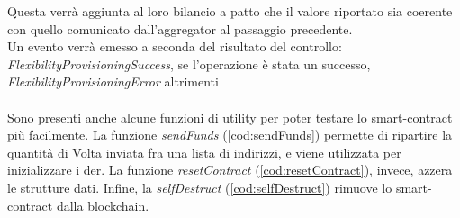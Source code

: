 Questa verrà aggiunta al loro bilancio a patto che il valore riportato sia coerente con quello comunicato dall'\gls{aggregator} al passaggio precedente. \\
Un evento verrà emesso a seconda del risultato del controllo: \textit{FlexibilityProvisioningSuccess}, se l'operazione è stata un successo, \textit{FlexibilityProvisioningError} altrimenti \\
\\
Sono presenti anche alcune funzioni di utility per poter testare lo \gls{smart-contract} più facilmente.
La funzione \textit{sendFunds} (\autoref{cod:sendFunds}) permette di ripartire la quantità di Volta inviata fra una lista di indirizzi,
e viene utilizzata per inizializzare i \gls{der}.
La funzione \textit{resetContract} (\autoref{cod:resetContract}), invece, azzera le strutture dati.
Infine, la \textit{selfDestruct} (\autoref{cod:selfDestruct}) rimuove lo \gls{smart-contract} dalla \gls{blockchain}.
